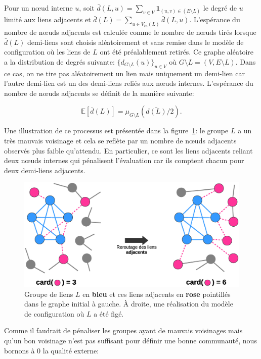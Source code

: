 Pour un n\oe{}ud interne $u$, soit $\bar{d}(L,u) = \sum_{v \in V} \mathbf{1}_{(u,v) \in (E \setminus L)}$ le degré de $u$ limité aux liens adjacents et $\bar{d}(L)=\sum_{u \in V_{in}(L)} \bar{d}(L,u)$.
L'espérance du nombre de n\oe{}uds adjacents est calculée comme le nombre de n\oe{}uds tirés lorsque $\bar{d}(L)$ demi-liens sont choisis aléatoirement et sans remise dans le modèle de configuration où les liens de $L$ ont été préalablement retirés.
Ce graphe aléatoire a la distribution de degrés suivante: $\{d_{G \setminus L }(u)\}_{u \in V}$ où $G \setminus L = (V,E\setminus L)$.
Dans ce cas, on ne tire pas aléatoirement un lien mais uniquement un demi-lien car l'autre demi-lien est un des demi-liens reliés aux n\oe{}uds internes.
L'espérance du nombre de n\oe{}uds adjacents se définit de la manière suivante:

\begin{equation}
	\mathbb{E}[\bar{d}(L)] = \mu_{G\setminus L}(\bar{d(L)}/2).
\end{equation}

Une illustration de ce processus est présentée dans la figure~\ref{fig:retourt_ext}: le groupe $L$ a un très mauvais voisinage et cela se reflète par un nombre de n\oe{}uds adjacents observés plus faible qu'attendu.
En particulier, ce sont les liens adjacents reliant deux n\oe{}uds internes qui pénalisent l'évaluation car ils comptent chacun pour deux demi-liens adjacents.

\begin{figure}
\centering
\includegraphics[width=0.7\linewidth]{img/ExpectedNodes/reroutageExt3}
\caption{Groupe de liens $L$ en \textcolor{semilightblue}{\textbf{bleu}} et ces liens adjacents en \textcolor{pinkyred}{\textbf{rose}} pointillés dans le graphe initial à gauche.
\`A droite, une réalisation du modèle de configuration où $L$ a été figé.}
\label{fig:retourt_ext}
\end{figure}

Comme il faudrait de pénaliser les groupes ayant de mauvais voisinages mais qu'un bon voisinage n'est pas suffisant pour définir une bonne communauté, nous bornons à $0$ la qualité externe:

